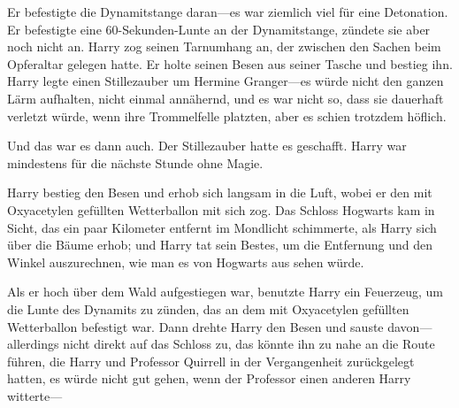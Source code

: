 

Er befestigte die Dynamitstange daran—es war ziemlich viel für eine Detonation.
Er befestigte eine 60-Sekunden-Lunte an der Dynamitstange, zündete sie aber noch nicht an.
Harry zog seinen Tarnumhang an, der zwischen den Sachen beim Opferaltar gelegen hatte.
Er holte seinen Besen aus seiner Tasche und bestieg ihn. Harry legte einen Stillezauber um Hermine Granger—es würde nicht den ganzen Lärm aufhalten, nicht einmal annähernd, und es war nicht so, dass sie dauerhaft verletzt würde, wenn ihre Trommelfelle platzten, aber es schien trotzdem höflich.

Und das war es dann auch. Der Stillezauber hatte es geschafft. Harry war mindestens für die nächste Stunde ohne Magie.

Harry bestieg den Besen und erhob sich langsam in die Luft, wobei er den mit Oxyacetylen gefüllten Wetterballon mit sich zog. Das Schloss Hogwarts kam in Sicht, das ein paar Kilometer entfernt im Mondlicht schimmerte, als Harry sich über die Bäume erhob; und Harry tat sein Bestes, um die Entfernung und den Winkel auszurechnen, wie man es von Hogwarts aus sehen würde.

Als er hoch über dem Wald aufgestiegen war, benutzte Harry ein Feuerzeug, um die Lunte des Dynamits zu zünden, das an dem mit Oxyacetylen gefüllten Wetterballon befestigt war. Dann drehte Harry den Besen und sauste davon—allerdings nicht direkt auf das Schloss zu, das könnte ihn zu nahe an die Route führen, die Harry und Professor Quirrell in der Vergangenheit zurückgelegt hatten, es würde nicht gut gehen, wenn der Professor einen anderen Harry witterte—


